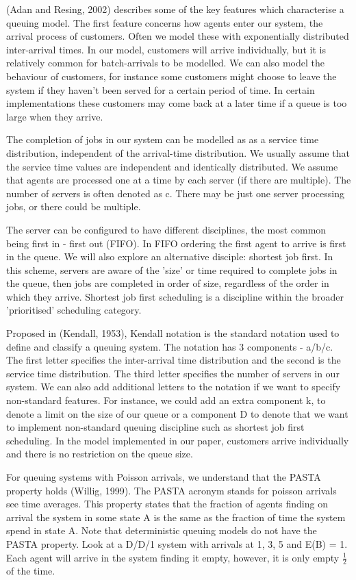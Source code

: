 \documentclass{article}
\begin{document}
    (Adan and Resing, 2002) describes some of the key features which characterise a queuing model. The first feature concerns how agents enter our system, the arrival process of customers. Often we model these with exponentially distributed inter-arrival times. In our model, customers will arrive individually, but it is relatively common for batch-arrivals to be modelled. We can also model the behaviour of customers, for instance some customers might choose to leave the system if they haven't been served for a certain period of time. In certain implementations these customers may come back at a later time if a queue is too large when they arrive.

    The completion of jobs in our system can be modelled as as a service time distribution, independent of the arrival-time distribution. We usually assume that the service time values are independent and identically distributed. We assume that agents are processed one at a time by each server (if there are multiple). The number of servers is often denoted as c. There may be just one server processing jobs, or there could be multiple.

    The server can be configured to have different disciplines, the most common being first in - first out (FIFO). In FIFO ordering the first agent to arrive is first in the queue. We will also explore an alternative disciple: shortest job first. In this scheme, servers are aware of the 'size' or time required to complete jobs in the queue, then jobs are completed in order of size, regardless of the order in which they arrive. Shortest job first scheduling is a discipline within the broader 'prioritised' scheduling category.

    Proposed in (Kendall, 1953), Kendall notation is the standard notation used to define and classify a queuing system. The notation has 3 components - a/b/c. The first letter specifies the inter-arrival time distribution and the second is the service time distribution. The third letter specifies the number of servers in our system. We can also add additional letters to the notation if we want to specify non-standard features. For instance, we could add an extra component k, to denote a limit on the size of our queue or a component D to denote that we want to implement non-standard queuing discipline such as shortest job first scheduling. In the model implemented in our paper, customers arrive individually and there is no restriction on the queue size.

    For queuing systems with Poisson arrivals, we understand that the PASTA property holds (Willig, 1999). The PASTA acronym stands for poisson arrivals see time averages. This property states that the fraction of agents finding on arrival the system in some state A is the same as the fraction of time the system spend in state A. Note that deterministic queuing models do not have the PASTA property. Look at a D/D/1 system with arrivals at 1, 3, 5 and E(B) = 1. Each agent will arrive in the system finding it empty, however, it is only empty $\frac{1}{2}$ of the time.
\end{document}
